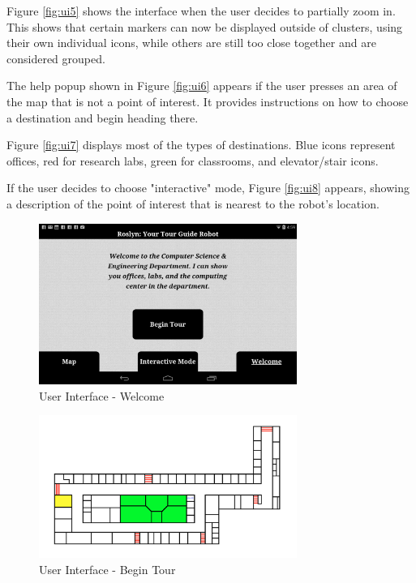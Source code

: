 \documentclass[11pt]{report}
\begin{document}
Figure \ref{fig:ui5} shows the interface when the user decides to partially zoom in. This shows that certain markers can now be displayed outside of clusters, using their own individual icons, while others are still too close together and are considered grouped.

The help popup shown in Figure \ref{fig:ui6} appears if the user presses an area of the map that is not a point of interest. It provides instructions on how to choose a destination and begin heading there.

Figure \ref{fig:ui7} displays most of the types of destinations. Blue icons represent offices, red for research labs, green for classrooms, and elevator/stair icons.

If the user decides to choose "interactive" mode, Figure \ref{fig:ui8} appears, showing a description of the point of interest that is nearest to the robot's location.

\begin{figure}[H]
 \centering
 \includegraphics[width=0.75\textwidth]{ui1.png}
 \caption{User Interface - Welcome}
 \label{fig:ui1}
\end{figure}

\begin{figure}[H]
 \centering
 \includegraphics[width=0.75\textwidth]{ui2.png}
 \caption{User Interface - Begin Tour}
 \label{fig:ui2}
\end{figure}
\end{document}
